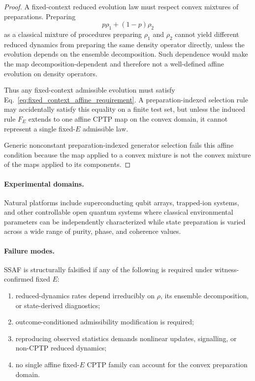 \documentclass[aps,prx,onecolumn,11pt]{revtex4-2}
\theoremstyle{plain}
\theoremstyle{definition}
\theoremstyle{remark}
\begin{document}
\begin{proof}
A fixed-context reduced evolution law must respect convex mixtures of
preparations. Preparing
\[
p\rho_1+(1-p)\rho_2
\]
as a classical mixture of procedures preparing \(\rho_1\) and
\(\rho_2\) cannot yield different reduced dynamics from preparing the
same density operator directly, unless the evolution depends on the
ensemble decomposition. Such dependence would make the map
decomposition-dependent and therefore not a well-defined affine
evolution on density operators.

Thus any fixed-context admissible evolution must satisfy
Eq.~\eqref{eq:fixed_context_affine_requirement}. A preparation-indexed
selection rule may accidentally satisfy this equality on a finite test
set, but unless the induced rule \(F_E\) extends to one affine CPTP map
on the convex domain, it cannot represent a single fixed-\(E\)
admissible law.

Generic nonconstant preparation-indexed generator selection fails this
affine condition because the map applied to a convex mixture is not the
convex mixture of the maps applied to its components.
\end{proof}

\paragraph{Experimental domains.}

Natural platforms include superconducting qubit arrays, trapped-ion
systems, and other controllable open quantum systems where classical
environmental parameters can be independently characterized while
state preparation is varied across a wide range of purity, phase, and
coherence values.

\paragraph{Failure modes.}

SSAF is structurally falsified if any of the following is required under
witness-confirmed fixed \(E\):

\begin{enumerate}[label=(\roman*), leftmargin=2.2em]
\item reduced-dynamics rates depend irreducibly on \(\rho\), its
ensemble decomposition, or state-derived diagnostics;
\item outcome-conditioned admissibility modification is required;
\item reproducing observed statistics demands nonlinear updates,
signalling, or non-CPTP reduced dynamics;
\item no single affine fixed-\(E\) CPTP family can account for the
convex preparation domain.
\end{enumerate}
\end{document}

